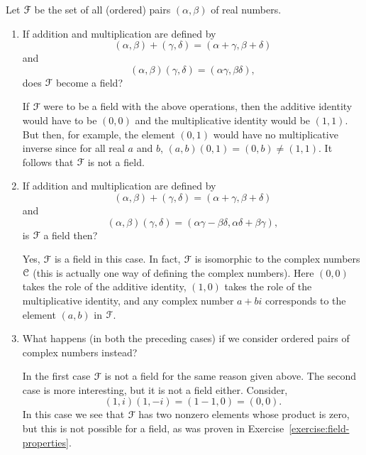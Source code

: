  Let $\mathcal{F}$ be the set of all (ordered) pairs
$(\alpha, \beta)$ of real numbers.
\begin{enumerate}
\item If addition and multiplication are defined by
  \begin{equation*}
    (\alpha,\beta) + (\gamma,\delta) = (\alpha+\gamma,\beta+\delta)
  \end{equation*}
  and
  \begin{equation*}
    (\alpha,\beta)(\gamma,\delta) = (\alpha\gamma,\beta\delta),
  \end{equation*}
  does $\mathcal{F}$ become a field?
  \begin{solution}
    If $\mathcal{F}$ were to be a field with the above operations, then the
    additive identity would have to be $(0, 0)$ and the multiplicative
    identity would be $(1,1)$. But then, for example, the element
    $(0, 1)$ would have no multiplicative inverse since for all real
    $a$ and $b$, $(a,b)(0,1) = (0,b) \neq (1,1)$. It follows that $\mathcal{F}$
    is not a field.
  \end{solution}
\item If addition and multiplication are defined by
  \begin{equation*}
    (\alpha, \beta) + (\gamma, \delta) = (\alpha + \gamma, \beta + \delta)
  \end{equation*}
  and
  \begin{equation*}
    (\alpha, \beta)(\gamma,\delta) = (\alpha\gamma - \beta\delta,
    \alpha\delta + \beta\gamma),
  \end{equation*}
  is $\mathcal{F}$ a field then?
  \begin{solution}
    Yes, $\mathcal{F}$ is a field in this case. In fact, $\mathcal{F}$ is isomorphic to
    the complex numbers $\mathcal{C}$ (this is actually one way of defining the
    complex numbers). Here $(0,0)$ takes the role of the additive
    identity, $(1,0)$ takes the role of the multiplicative identity,
    and any complex number $a + bi$ corresponds to the element $(a,b)$
    in $\mathcal{F}$.
  \end{solution}
\item What happens (in both the preceding cases) if we consider
  ordered pairs of complex numbers instead?
  \begin{solution}
    In the first case $\mathcal{F}$ is not a field for the same reason given
    above. The second case is more interesting, but it is not a field
    either. Consider,
    \begin{equation*}
      (1, i)(1, -i) = (1 - 1, 0) = (0, 0).
    \end{equation*}
    In this case we see that $\mathcal{F}$ has two nonzero elements whose
    product is zero, but this is not possible for a field, as was
    proven in Exercise~\ref{exercise:field-properties}.
  \end{solution}
\end{enumerate}
